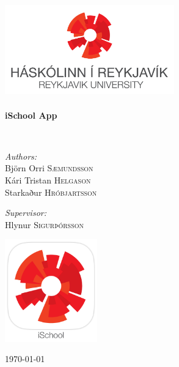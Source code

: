 \begin{titlepage}
\begin{center}


~\\
~\\
~\\

\includegraphics[width=0.55\textwidth]{RUheader.png}~\\[1cm]


\color{dark-gray-Large}\HRule \\[0.4cm]
{ \huge \bfseries \color{dark-gray-Large}iSchool App \\[0.4cm] }

\HRule \\[1.5cm]

\noindent
\begin{minipage}{0.4\textwidth}
\begin{flushleft} \large
\emph{\color{dark-gray}Authors:}\\
\color{dark-gray}Björn Orri \textsc{Sæmundsson}\\
Kári Tristan \textsc{Helgason}\\
Starkaður \textsc{Hróbjartsson}\\
\end{flushleft}
\end{minipage}%
\begin{minipage}{0.4\textwidth}
\begin{flushright} \large
\emph{\color{dark-gray}Supervisor:} \\
\color{dark-gray}Hlynur \textsc{Sigurþórsson}
\end{flushright}
\end{minipage}

\vspace{0.3in}

\includegraphics[width=0.30\textwidth]{AppIcon.jpg}

\vspace{0.2in}

{\large \today}

\end{center}
\end{titlepage}
